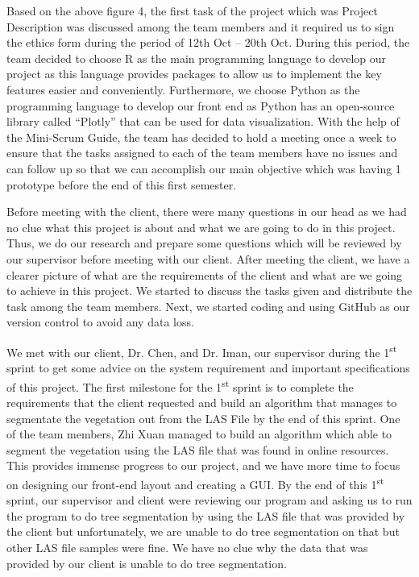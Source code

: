 \documentclass[a4paper, 12pt]{article}
\begin{document}
Based on the above figure 4, the first task of the project which was Project Description was discussed among the team members and it required us to sign the ethics form during the period of 12th Oct – 20th Oct. During this period, the team decided to choose R as the main programming language to develop our project as this language provides packages to allow us to implement the key features easier and conveniently. Furthermore, we choose Python as the programming language to develop our front end as Python has an open-source library called “Plotly” that can be used for data visualization. With the help of the Mini-Scrum Guide, the team has decided to hold a meeting once a week to ensure that the tasks assigned to each of the team members have no issues and can follow up so that we can accomplish our main objective which was having 1 prototype before the end of this first semester.


Before meeting with the client, there were many questions in our head as we had no clue what this project is about and what we are going to do in this project. Thus, we do our research and prepare some questions which will be reviewed by our supervisor before meeting with our client. After meeting the client, we have a clearer picture of what are the requirements of the client and what are we going to achieve in this project. We started to discuss the tasks given and distribute the task among the team members. Next, we started coding and using GitHub as our version control to avoid any data loss.

We met with our client, Dr. Chen, and Dr. Iman, our supervisor during the 1\textsuperscript{st} sprint to get some advice on the system requirement and important specifications of this project. The first milestone for the 1\textsuperscript{st} sprint is to complete the requirements that the client requested and build an algorithm that manages to segmentate the vegetation out from the LAS File by the end of this sprint. One of the team members, Zhi Xuan managed to build an algorithm which able to segment the vegetation using the LAS file that was found in online resources. This provides immense progress to our project, and we have more time to focus on designing our front-end layout and creating a GUI. By the end of this 1\textsuperscript{st} sprint, our supervisor and client were reviewing our program and asking us to run the program to do tree segmentation by using the LAS file that was provided by the client but unfortunately, we are unable to do tree segmentation on that but other LAS file samples were fine. We have no clue why the data that was provided by our client is unable to do tree segmentation.
\end{document}
